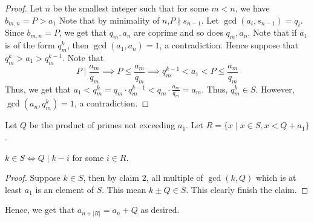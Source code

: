 \documentclass[11pt]{article}
\begin{document}
\begin{proof}
    Let $n$ be the smallest integer such that for some $m<n$, we have $b_{m,n} = P > a_1$
Note that by minimality of $n$,$P \nmid s_{n-1}$. Let $\gcd(a_i,s_{n-1}) = q_i$. Since $b_{m,n} =P$, we get that $q_m,a_n$ are coprime and so does $q_m,a_n$. Note that if $a_1$ is of the form $q_m^k$, then $\gcd(a_1,a_n) =1$, a contradiction. Hence suppose that $q_m^{k} > a_1 > q_m^{k-1}$. Note that$$P \mid \frac{a_m}{q_m} \implies P \leqslant \frac{a_m}{q_m} \implies q_m^{k-1} < a_1 < P \leqslant \frac{a_m}{q_m}$$Thus, we get that $a_1< q_m^k = q_m \cdot q_m^{k-1} < q_m \cdot \frac{a_m}{q_m} = a_m$. Thus, $q_m^k \in S$. However, $\gcd(a_n,q_m^k) = 1$, a contradiction.
\end{proof}
\noindent
Let $Q$ be the product of primes not exceeding $a_1$. Let $R = \{x \mid x \in S, x < Q+a_1\}$.
\begin{claim}
    $k \in S \iff Q \mid k-i$ for some $i \in R$.
\end{claim}
\begin{proof}
    Suppose $k \in S$, then by claim $2$, all multiple of $\gcd(k,Q)$ which is at least $a_1$ is an element of $S$. This mean $k \pm Q \in S$. This clearly finish the claim.
\end{proof}
\noindent
Hence, we get that $a_{n+|R|} = a_{n} + Q$ as desired.
\end{document}

